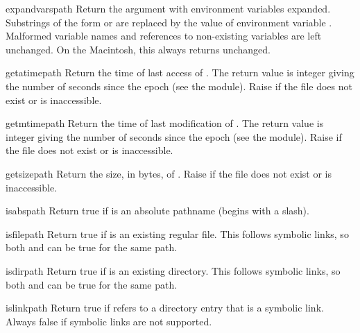 \begin{funcdesc}{expandvars}{path}
Return the argument with environment variables expanded.  Substrings
of the form  or  are
replaced by the value of environment variable .  Malformed
variable names and references to non-existing variables are left
unchanged.  On the Macintosh, this always returns 
unchanged.
\end{funcdesc}

\begin{funcdesc}{getatime}{path}
Return the time of last access of .  The return
value is integer giving the number of seconds since the epoch (see the 
 module).  Raise  if the file does
not exist or is inaccessible.
\end{funcdesc}

\begin{funcdesc}{getmtime}{path}
Return the time of last modification of .  The return
value is integer giving the number of seconds since the epoch (see the 
 module).  Raise  if the file does
not exist or is inaccessible.
\end{funcdesc}

\begin{funcdesc}{getsize}{path}
Return the size, in bytes, of .  Raise
 if the file does not exist or is inaccessible.
\end{funcdesc}

\begin{funcdesc}{isabs}{path}
Return true if  is an absolute pathname (begins with a
slash).
\end{funcdesc}

\begin{funcdesc}{isfile}{path}
Return true if  is an existing regular file.  This follows
symbolic links, so both  and 
can be true for the same path.
\end{funcdesc}

\begin{funcdesc}{isdir}{path}
Return true if  is an existing directory.  This follows
symbolic links, so both  and  can
be true for the same path.
\end{funcdesc}

\begin{funcdesc}{islink}{path}
Return true if  refers to a directory entry that is a
symbolic link.  Always false if symbolic links are not supported.
\end{funcdesc}

